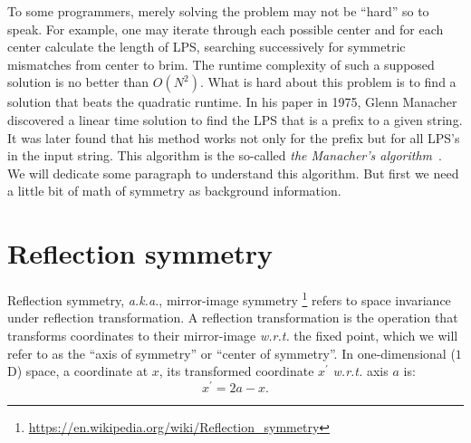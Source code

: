 To some programmers, merely solving the problem may not be ``hard'' so to speak.
For example, one may iterate through each possible center and for each center calculate the
length of LPS, searching successively for symmetric mismatches from center to brim.
The runtime complexity of such a supposed solution is no better than $O(N^2)$.
What is hard about this problem is to find a solution that beats the quadratic runtime.
In his paper in 1975, Glenn Manacher discovered a linear time solution to find the LPS that is a
prefix to a given string.
It was later found that his method works not only for the prefix but for all LPS's in the input
string.
This algorithm is the so-called \textit{the Manacher's algorithm}~\cite{Manacher:1975}.
We will dedicate some paragraph to understand this algorithm.
But first we need a little bit of math of symmetry as background information.


\section{Reflection symmetry}\label{sec:reflection-symmetry}

Reflection symmetry, \textit{a.k.a.}, mirror-image symmetry
\footnote{\url{https://en.wikipedia.org/wiki/Reflection_symmetry}} refers to space invariance
under reflection transformation.
A reflection transformation is the operation that transforms coordinates to their
mirror-image \textit{w.r.t.} the fixed point, which we will refer to as the ``axis of symmetry'' or
``center of symmetry''.
In one-dimensional ($1$D) space, a coordinate at $x$, its transformed coordinate $x^\prime$
\textit{w.r.t.} axis $a$ is:
\begin{equation}
    \label{eq:reflection-transform}
    x^\prime = 2a - x.
\end{equation}

